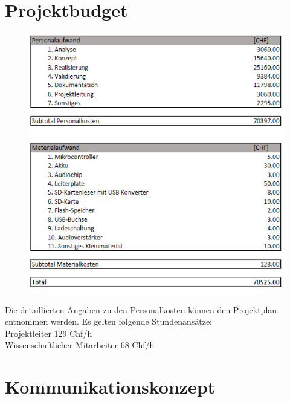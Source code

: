 \documentclass[10pt,a4paper,oneside]{99_fhnwreport}
\begin{document}
\section{Projektbudget}\label{sec:projektbudget}

\begin{figure}[htbp]
	\centering
	\includegraphics[width=13.5cm]{Projektbudget.png}
\end{figure}
Die detaillierten Angaben zu den Personalkosten können den Projektplan entnommen werden. Es gelten folgende Stundenansätze:\\
Projektleiter 129 Chf/h \\
Wissenschaftlicher Mitarbeiter 68 Chf/h

\newpage
\section{Kommunikationskonzept \label{sec:kommunikationskonzept}}
\end{document}
